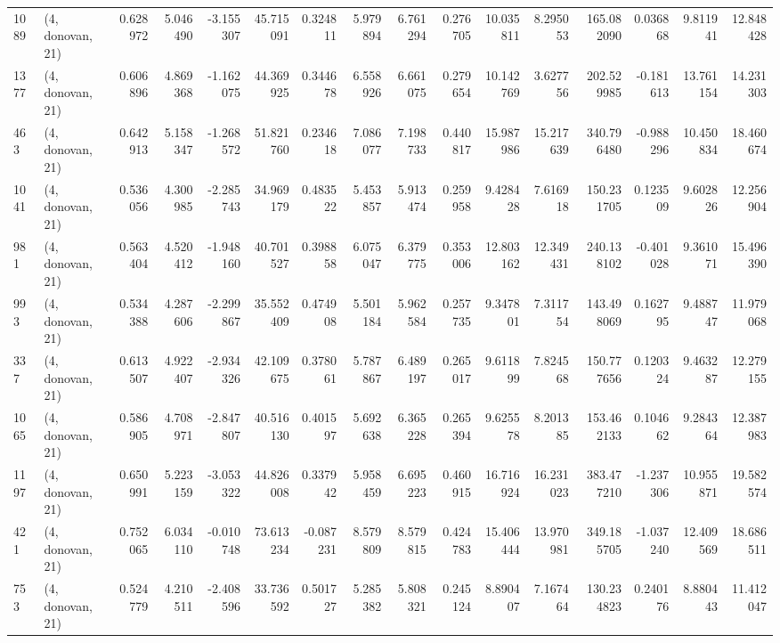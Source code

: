 \begin{tabular}{llrrrrrrrrrrrrrr}
1089 &  (4, donovan, 21) &   0.628972 &   5.046490 &  -3.155307 &     45.715091 &    0.324811 &    5.979894 &    6.761294 &  0.276705 &  10.035811 &   8.295053 &   165.082090 &   0.036868 &   9.811941 &  12.848428 \\
1377 &  (4, donovan, 21) &   0.606896 &   4.869368 &  -1.162075 &     44.369925 &    0.344678 &    6.558926 &    6.661075 &  0.279654 &  10.142769 &   3.627756 &   202.529985 &  -0.181613 &  13.761154 &  14.231303 \\
463  &  (4, donovan, 21) &   0.642913 &   5.158347 &  -1.268572 &     51.821760 &    0.234618 &    7.086077 &    7.198733 &  0.440817 &  15.987986 &  15.217639 &   340.796480 &  -0.988296 &  10.450834 &  18.460674 \\
1041 &  (4, donovan, 21) &   0.536056 &   4.300985 &  -2.285743 &     34.969179 &    0.483522 &    5.453857 &    5.913474 &  0.259958 &   9.428428 &   7.616918 &   150.231705 &   0.123509 &   9.602826 &  12.256904 \\
981  &  (4, donovan, 21) &   0.563404 &   4.520412 &  -1.948160 &     40.701527 &    0.398858 &    6.075047 &    6.379775 &  0.353006 &  12.803162 &  12.349431 &   240.138102 &  -0.401028 &   9.361071 &  15.496390 \\
993  &  (4, donovan, 21) &   0.534388 &   4.287606 &  -2.299867 &     35.552409 &    0.474908 &    5.501184 &    5.962584 &  0.257735 &   9.347801 &   7.311754 &   143.498069 &   0.162795 &   9.488747 &  11.979068 \\
337  &  (4, donovan, 21) &   0.613507 &   4.922407 &  -2.934326 &     42.109675 &    0.378061 &    5.787867 &    6.489197 &  0.265017 &   9.611899 &   7.824568 &   150.777656 &   0.120324 &   9.463287 &  12.279155 \\
1065 &  (4, donovan, 21) &   0.586905 &   4.708971 &  -2.847807 &     40.516130 &    0.401597 &    5.692638 &    6.365228 &  0.265394 &   9.625578 &   8.201385 &   153.462133 &   0.104662 &   9.284364 &  12.387983 \\
1197 &  (4, donovan, 21) &   0.650991 &   5.223159 &  -3.053322 &     44.826008 &    0.337942 &    5.958459 &    6.695223 &  0.460915 &  16.716924 &  16.231023 &   383.477210 &  -1.237306 &  10.955871 &  19.582574 \\
421  &  (4, donovan, 21) &   0.752065 &   6.034110 &  -0.010748 &     73.613234 &   -0.087231 &    8.579809 &    8.579815 &  0.424783 &  15.406444 &  13.970981 &   349.185705 &  -1.037240 &  12.409569 &  18.686511 \\
753  &  (4, donovan, 21) &   0.524779 &   4.210511 &  -2.408596 &     33.736592 &    0.501727 &    5.285382 &    5.808321 &  0.245124 &   8.890407 &   7.167464 &   130.234823 &   0.240176 &   8.880443 &  11.412047 \\

\end{tabular}
